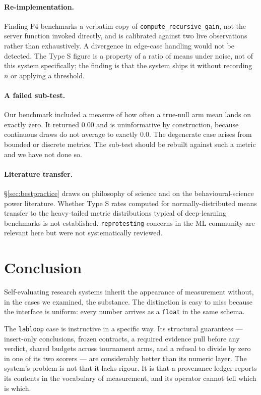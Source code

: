 \documentclass[10pt,twocolumn,letterpaper]{article}
\newcommand{\code}[1]{\texttt{#1}}
\begin{document}
\paragraph{Re-implementation.} Finding F4 benchmarks a verbatim copy of
\code{compute\_recursive\_gain}, not the server function invoked directly, and is calibrated
against two live observations rather than exhaustively. A divergence in edge-case handling would
not be detected. The Type S figure is a property of a ratio of means under noise, not of this
system specifically; the finding is that the system ships it without recording $n$ or applying a
threshold.

\paragraph{A failed sub-test.} Our benchmark included a measure of how often a true-null arm mean
lands on exactly zero. It returned $0.00$ and is uninformative by construction, because continuous
draws do not average to exactly $0.0$. The degenerate case arises from bounded or discrete metrics.
The sub-test should be rebuilt against such a metric and we have not done so.

\paragraph{Literature transfer.} \S\ref{sec:bestpractice} draws on philosophy of science and on the
behavioural-science power literature. Whether Type S rates computed for normally-distributed
means transfer to the heavy-tailed metric distributions typical of deep-learning benchmarks is not
established. \code{reprotesting} concerns in the ML community are relevant here but were not
systematically reviewed.

\section{Conclusion}
\label{sec:conclusion}

Self-evaluating research systems inherit the appearance of measurement without, in the cases we
examined, the substance. The distinction is easy to miss because the interface is uniform: every
number arrives as a \code{float} in the same schema.

The \code{labloop} case is instructive in a specific way. Its structural guarantees --- insert-only
conclusions, frozen contracts, a required evidence pull before any verdict, shared budgets across
tournament arms, and a refusal to divide by zero in one of its two scorers --- are considerably
better than its numeric layer. The system's problem is not that it lacks rigour. It is that a
provenance ledger reports its contents in the vocabulary of measurement, and its operator cannot
tell which is which.
\end{document}
